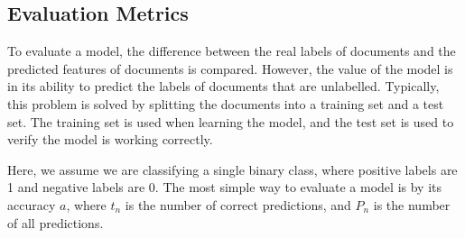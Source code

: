 




\subsection{Evaluation Metrics}

To evaluate a model, the difference between the real labels of documents and the predicted features of documents is compared. However, the value of the model is in its ability to predict the labels of documents that are unlabelled. Typically, this problem is solved by splitting the documents into a training set and a test set. The training set is used when learning the model, and the test set is used to verify the model is working correctly. 

Here, we assume we are classifying a single binary class, where positive labels are 1 and negative labels are 0. The most simple way to evaluate a model is by its accuracy $a$, where ${t_n}$ is the number of correct predictions, and $P_n$ is the number of all predictions.


